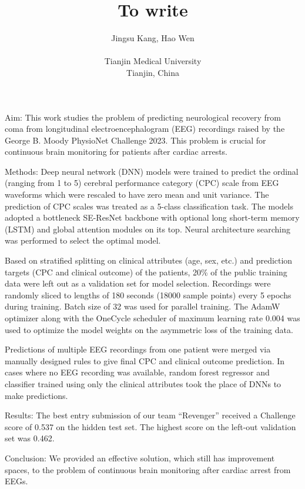 \documentclass{cinc-abstract}
\begin{document}
\title{To write}

\author {Jingsu Kang, Hao Wen\\ %
\ \\ %
Tianjin Medical University\\  %
Tianjin, China} %

\maketitle



Aim: This work studies the problem of predicting neurological recovery from coma from longitudinal electroencephalogram (EEG) recordings raised by the George B. Moody PhysioNet Challenge 2023. This problem is crucial for continuous brain monitoring for patients after cardiac arrests.

Methods: Deep neural network (DNN) models were trained to predict the ordinal (ranging from 1 to 5) cerebral performance category (CPC) scale from EEG waveforms which were rescaled to have zero mean and unit variance. The prediction of CPC scales was treated as a 5-class classification task. The models adopted a bottleneck SE-ResNet backbone with optional long short-term memory (LSTM) and global attention modules on its top. Neural architecture searching was performed to select the optimal model.

Based on stratified splitting on clinical attributes (age, sex, etc.) and prediction targets (CPC and clinical outcome) of the patients, 20\% of the public training data were left out as a validation set for model selection. Recordings were randomly sliced to lengths of 180 seconds (18000 sample points) every 5 epochs during training. Batch size of 32 was used for parallel training. The AdamW optimizer along with the OneCycle scheduler of maximum learning rate 0.004 was used to optimize the model weights on the asymmetric loss of the training data.

Predictions of multiple EEG recordings from one patient were merged via manually designed rules to give final CPC and clinical outcome prediction. In cases where no EEG recording was available, random forest regressor and classifier trained using only the clinical attributes took the place of DNNs to make predictions.

Results: The best entry submission of our team ``Revenger'' received a Challenge score of 0.537 on the hidden test set. The highest score on the left-out validation set was 0.462.

Conclusion: We provided an effective solution, which still has improvement spaces, to the problem of continuous brain monitoring after cardiac arrest from EEGs.
\end{document}
